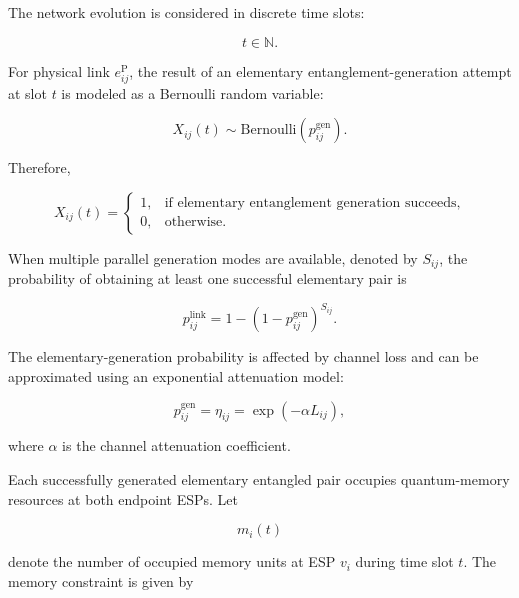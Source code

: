 The network evolution is considered in discrete time slots:

\begin{equation}
    t \in \mathbb{N}.
\end{equation}

For physical link $e_{ij}^{\mathrm{P}}$, the result of an elementary entanglement-generation attempt at slot $t$ is modeled as a Bernoulli random variable:

\begin{equation}
    X_{ij}(t)
    \sim
    \mathrm{Bernoulli}
    \left(
    p_{ij}^{\mathrm{gen}}
    \right).
\end{equation}

Therefore,

\begin{equation}
    X_{ij}(t)
    =
    \begin{cases}
        1, & \text{if elementary entanglement generation succeeds},\\
        0, & \text{otherwise}.
    \end{cases}
\end{equation}

When multiple parallel generation modes are available, denoted by $S_{ij}$, the probability of obtaining at least one successful elementary pair is

\begin{equation}
    p_{ij}^{\mathrm{link}}
    =
    1-
    \left(
    1-p_{ij}^{\mathrm{gen}}
    \right)^{S_{ij}} .
\end{equation}

The elementary-generation probability is affected by channel loss and can be approximated using an exponential attenuation model:

\begin{equation}
    p_{ij}^{\mathrm{gen}}
    =
    \eta_{ij}
    =
    \exp
    \left(
    -\alpha L_{ij}
    \right),
\end{equation}

where $\alpha$ is the channel attenuation coefficient.

Each successfully generated elementary entangled pair occupies quantum-memory resources at both endpoint ESPs. Let

\begin{equation}
    m_i(t)
\end{equation}

denote the number of occupied memory units at ESP $v_i$ during time slot $t$. The memory constraint is given by

